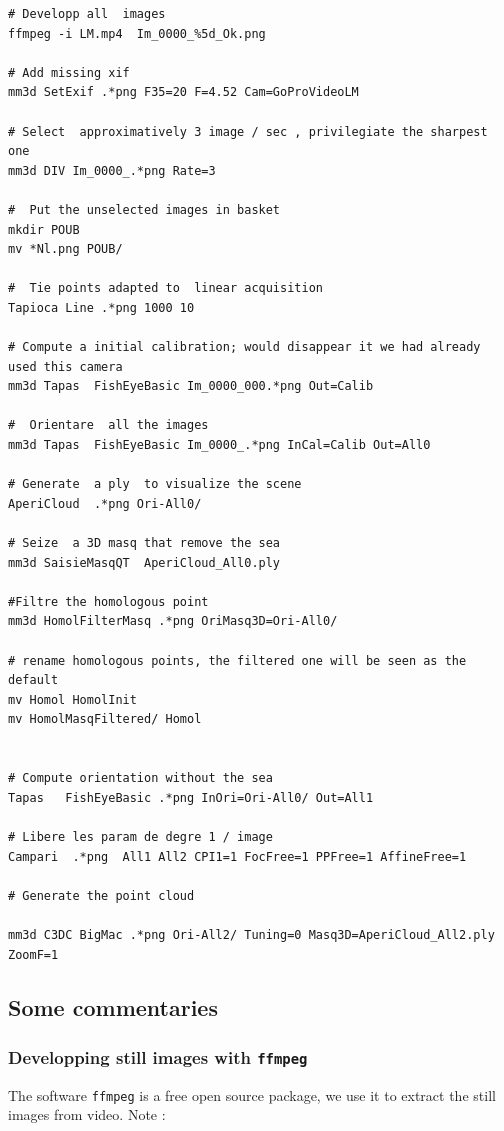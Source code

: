 \begin{verbatim}
# Developp all  images
ffmpeg -i LM.mp4  Im_0000_%5d_Ok.png

# Add missing xif
mm3d SetExif .*png F35=20 F=4.52 Cam=GoProVideoLM

# Select  approximatively 3 image / sec , privilegiate the sharpest one
mm3d DIV Im_0000_.*png Rate=3

#  Put the unselected images in basket
mkdir POUB
mv *Nl.png POUB/

#  Tie points adapted to  linear acquisition
Tapioca Line .*png 1000 10

# Compute a initial calibration; would disappear it we had already used this camera
mm3d Tapas  FishEyeBasic Im_0000_000.*png Out=Calib

#  Orientare  all the images
mm3d Tapas  FishEyeBasic Im_0000_.*png InCal=Calib Out=All0

# Generate  a ply  to visualize the scene
AperiCloud  .*png Ori-All0/

# Seize  a 3D masq that remove the sea
mm3d SaisieMasqQT  AperiCloud_All0.ply

#Filtre the homologous point
mm3d HomolFilterMasq .*png OriMasq3D=Ori-All0/

# rename homologous points, the filtered one will be seen as the default
mv Homol HomolInit
mv HomolMasqFiltered/ Homol


# Compute orientation without the sea
Tapas   FishEyeBasic .*png InOri=Ori-All0/ Out=All1

# Libere les param de degre 1 / image
Campari  .*png  All1 All2 CPI1=1 FocFree=1 PPFree=1 AffineFree=1

# Generate the point cloud

mm3d C3DC BigMac .*png Ori-All2/ Tuning=0 Masq3D=AperiCloud_All2.ply ZoomF=1

\end{verbatim}



\subsection{Some commentaries}\label{GoProVideo:Comments}


\subsubsection{Developping still images with  {\tt ffmpeg}}

The software  {\tt ffmpeg} is a free open source package, we use it to extract the still images from video. Note :

